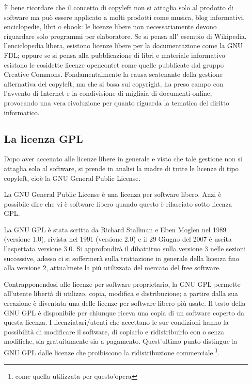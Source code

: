 \`E bene ricordare che il concetto di copyleft non si attaglia solo al prodotto di software ma può essere applicato a molti prodotti come musica, blog informativi, enciclopedie, libri o ebook: le licenze libere non necessariamente devono riguardare solo programmi per elaboratore. Se si pensa  all' esempio di Wikipedia, l'enciclopedia libera,  esistono licenze libere per la documentazione come la GNU FDL; oppure se si pensa alla pubblicazione di libri e materiale informativo esistono le cosìdette licenze opencontet come quelle pubblicate dal gruppo Creative Commons.
Fondamentalmente la causa scatenante della gestione alternativa del copyleft, ma che si basa sul copyright, ha preso campo con l'avvento di Internet e la condivisione di migliaia di documenti online, provocando una vera rivoluzione per quanto riguarda la tematica del diritto informatico.


\subsection{La licenza GPL}

Dopo aver accenato alle licenze libere in generale e visto che tale gestione non si attaglia solo al software, si prende in analisi la madre di tutte le licenze di tipo copyleft, cioè la GNU General Public License.

La GNU General Public License è una licenza per software libero. Anzi è possibile dire che vi è software libero quando questo è rilasciato sotto licenza GPL.

La GNU GPL è stata scritta da Richard Stallman e Eben Moglen nel 1989 (versione 1.0), rivista nel 1991 (versione 2.0) e il 29 Giugno del 2007 è uscita l'aspettata versione 3.0. Si approfondirà il dibattituo sulla versione 3 nelle sezioni successive, adesso ci si soffermerà sulla trattazione in generale della licenza fino alla versione 2, attualmete la più utilizzata del mercato del free software.

Contrapponendosi alle licenze per software proprietario, la GNU GPL permette all'utente libertà di utilizzo, copia, modifica e distribuzione; a partire dalla sua creazione è diventata una delle licenze per software libero più usate. Il testo della GNU GPL è disponibile per chiunque riceva una copia di un software coperto da questa licenza. I licenziatari/utenti che accettano le sue condizioni hanno la possibilità di modificare il software, di copiarlo e ridistribuirlo con o senza modifiche, sia gratuitamente sia a pagamento. Quest'ultimo punto distingue la GNU GPL dalle licenze che proibiscono la ridistribuzione commerciale.\footnote{come quella utilizzata per questo'opera}.

